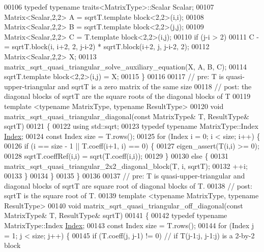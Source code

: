 \begin{DoxyCode}
00106   \textcolor{keyword}{typedef} \textcolor{keyword}{typename} traits<MatrixType>::Scalar Scalar;
00107   Matrix<Scalar,2,2> A = sqrtT.template block<2,2>(i,i);
00108   Matrix<Scalar,2,2> B = sqrtT.template block<2,2>(j,j);
00109   Matrix<Scalar,2,2> C = T.template block<2,2>(i,j);
00110   \textcolor{keywordflow}{if} (j-i > 2)
00111     C -= sqrtT.block(i, i+2, 2, j-i-2) * sqrtT.block(i+2, j, j-i-2, 2);
00112   Matrix<Scalar,2,2> X;
00113   matrix\_sqrt\_quasi\_triangular\_solve\_auxiliary\_equation(X, A, B, C);
00114   sqrtT.template block<2,2>(i,j) = X;
00115 \}
00116 
00117 \textcolor{comment}{// pre:  T is quasi-upper-triangular and sqrtT is a zero matrix of the same size}
00118 \textcolor{comment}{// post: the diagonal blocks of sqrtT are the square roots of the diagonal blocks of T}
00119 \textcolor{keyword}{template} <\textcolor{keyword}{typename} MatrixType, \textcolor{keyword}{typename} ResultType>
00120 \textcolor{keywordtype}{void} matrix\_sqrt\_quasi\_triangular\_diagonal(\textcolor{keyword}{const} MatrixType& T, ResultType& sqrtT)
00121 \{
00122   \textcolor{keyword}{using} std::sqrt;
00123   \textcolor{keyword}{typedef} \textcolor{keyword}{typename} MatrixType::Index \hyperlink{namespace_eigen_a62e77e0933482dafde8fe197d9a2cfde}{Index};
00124   \textcolor{keyword}{const} Index size = T.rows();
00125   \textcolor{keywordflow}{for} (Index i = 0; i < size; i++) \{
00126     \textcolor{keywordflow}{if} (i == size - 1 || T.coeff(i+1, i) == 0) \{
00127       eigen\_assert(T(i,i) >= 0);
00128       sqrtT.coeffRef(i,i) = sqrt(T.coeff(i,i));
00129     \}
00130     \textcolor{keywordflow}{else} \{
00131       matrix\_sqrt\_quasi\_triangular\_2x2\_diagonal\_block(T, i, sqrtT);
00132       ++i;
00133     \}
00134   \}
00135 \}
00136 
00137 \textcolor{comment}{// pre:  T is quasi-upper-triangular and diagonal blocks of sqrtT are square root of diagonal blocks of T.}
00138 \textcolor{comment}{// post: sqrtT is the square root of T.}
00139 \textcolor{keyword}{template} <\textcolor{keyword}{typename} MatrixType, \textcolor{keyword}{typename} ResultType>
00140 \textcolor{keywordtype}{void} matrix\_sqrt\_quasi\_triangular\_off\_diagonal(\textcolor{keyword}{const} MatrixType& T, ResultType& sqrtT)
00141 \{
00142   \textcolor{keyword}{typedef} \textcolor{keyword}{typename} MatrixType::Index \hyperlink{namespace_eigen_a62e77e0933482dafde8fe197d9a2cfde}{Index};
00143   \textcolor{keyword}{const} Index size = T.rows();
00144   \textcolor{keywordflow}{for} (Index j = 1; j < size; j++) \{
00145       \textcolor{keywordflow}{if} (T.coeff(j, j-1) != 0)  \textcolor{comment}{// if T(j-1:j, j-1:j) is a 2-by-2 block}

\end{DoxyCode}
